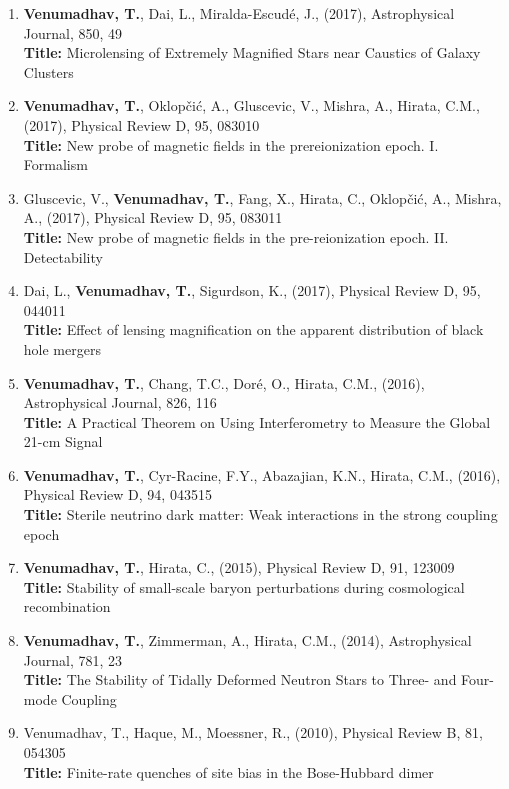 \documentclass{article}
\newcommand{\apj}{Astrophysical Journal}
\newcommand{\prb}{Physical Review B}
\newcommand{\prd}{Physical Review D}
\begin{document}
{\begin{enumerate}[leftmargin=*,itemsep=0.45em,topsep=0.35em]
\item \textbf{Venumadhav, T.}, Dai, L., Miralda-Escudé, J., (2017), \apj, 850, 49 \\
\textbf{Title:} Microlensing of Extremely Magnified Stars near Caustics of Galaxy Clusters
\item \textbf{Venumadhav, T.}, Oklopčić, A., Gluscevic, V., Mishra, A., Hirata, C.M., (2017), \prd, 95, 083010 \\
\textbf{Title:} New probe of magnetic fields in the prereionization epoch. I. Formalism
\item Gluscevic, V., \textbf{Venumadhav, T.}, Fang, X., Hirata, C., Oklopčić, A., Mishra, A., (2017), \prd, 95, 083011 \\
\textbf{Title:} New probe of magnetic fields in the pre-reionization epoch. II. Detectability
\item Dai, L., \textbf{Venumadhav, T.}, Sigurdson, K., (2017), \prd, 95, 044011 \\
\textbf{Title:} Effect of lensing magnification on the apparent distribution of black hole mergers
\item \textbf{Venumadhav, T.}, Chang, T.C., Doré, O., Hirata, C.M., (2016), \apj, 826, 116 \\
\textbf{Title:} A Practical Theorem on Using Interferometry to Measure the Global 21-cm Signal
\item \textbf{Venumadhav, T.}, Cyr-Racine, F.Y., Abazajian, K.N., Hirata, C.M., (2016), \prd, 94, 043515 \\
\textbf{Title:} Sterile neutrino dark matter: Weak interactions in the strong coupling epoch
\item \textbf{Venumadhav, T.}, Hirata, C., (2015), \prd, 91, 123009 \\
\textbf{Title:} Stability of small-scale baryon perturbations during cosmological recombination
\item \textbf{Venumadhav, T.}, Zimmerman, A., Hirata, C.M., (2014), \apj, 781, 23 \\
\textbf{Title:} The Stability of Tidally Deformed Neutron Stars to Three- and Four-mode Coupling
\item Venumadhav, T., Haque, M., Moessner, R., (2010), \prb, 81, 054305 \\
\textbf{Title:} Finite-rate quenches of site bias in the Bose-Hubbard dimer
\end{enumerate}
\par}

\noindent\underline{}
\\
\end{document}
